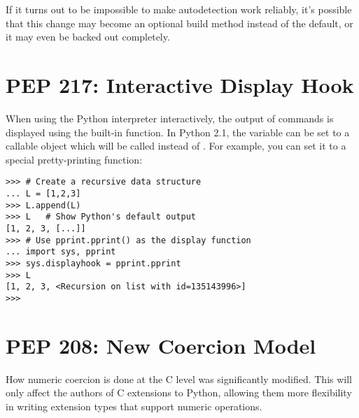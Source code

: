 \documentclass{howto}
\begin{document}
If it turns out to be impossible to make autodetection work reliably,
it's possible that this change may become an optional build method
instead of the default, or it may even be backed out completely.

\begin{seealso}
\end{seealso}

\section{PEP 217: Interactive Display Hook}

When using the Python interpreter interactively, the output of
commands is displayed using the built-in  function.
In Python 2.1, the variable  can be set to a
callable object which will be called instead of .
For example, you can set it to a special pretty-printing function:

\begin{verbatim}
>>> # Create a recursive data structure
... L = [1,2,3]
>>> L.append(L)
>>> L   # Show Python's default output
[1, 2, 3, [...]]
>>> # Use pprint.pprint() as the display function
... import sys, pprint
>>> sys.displayhook = pprint.pprint
>>> L
[1, 2, 3, <Recursion on list with id=135143996>]
>>> 
\end{verbatim}

\begin{seealso}


\end{seealso}

\section{PEP 208: New Coercion Model}

How numeric coercion is done at the C level was significantly
modified.  This will only affect the authors of C extensions to
Python, allowing them more flexibility in writing extension types that
support numeric operations.
\end{document}
